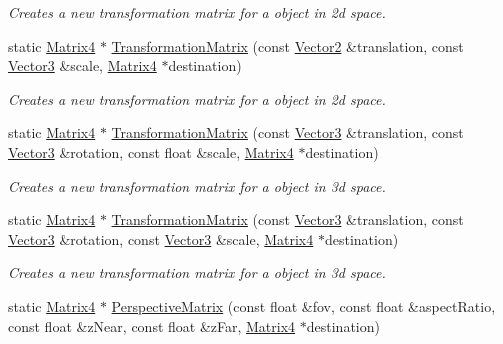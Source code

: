 \begin{DoxyCompactItemize}
\begin{DoxyCompactList}\small\item\em Creates a new transformation matrix for a object in 2d space. \end{DoxyCompactList}\item 
static \hyperlink{class_flounder_1_1_matrix4}{Matrix4} $\ast$ \hyperlink{class_flounder_1_1_matrix4_af42c941d750d1f3ecbafee37783585e3}{Transformation\+Matrix} (const \hyperlink{class_flounder_1_1_vector2}{Vector2} \&translation, const \hyperlink{class_flounder_1_1_vector3}{Vector3} \&scale, \hyperlink{class_flounder_1_1_matrix4}{Matrix4} $\ast$destination)
\begin{DoxyCompactList}\small\item\em Creates a new transformation matrix for a object in 2d space. \end{DoxyCompactList}\item 
static \hyperlink{class_flounder_1_1_matrix4}{Matrix4} $\ast$ \hyperlink{class_flounder_1_1_matrix4_afe0285002331ae41bc05c7ff9aa1bdc3}{Transformation\+Matrix} (const \hyperlink{class_flounder_1_1_vector3}{Vector3} \&translation, const \hyperlink{class_flounder_1_1_vector3}{Vector3} \&rotation, const float \&scale, \hyperlink{class_flounder_1_1_matrix4}{Matrix4} $\ast$destination)
\begin{DoxyCompactList}\small\item\em Creates a new transformation matrix for a object in 3d space. \end{DoxyCompactList}\item 
static \hyperlink{class_flounder_1_1_matrix4}{Matrix4} $\ast$ \hyperlink{class_flounder_1_1_matrix4_a2cb52b3b50b088eb44af475d086cb329}{Transformation\+Matrix} (const \hyperlink{class_flounder_1_1_vector3}{Vector3} \&translation, const \hyperlink{class_flounder_1_1_vector3}{Vector3} \&rotation, const \hyperlink{class_flounder_1_1_vector3}{Vector3} \&scale, \hyperlink{class_flounder_1_1_matrix4}{Matrix4} $\ast$destination)
\begin{DoxyCompactList}\small\item\em Creates a new transformation matrix for a object in 3d space. \end{DoxyCompactList}\item 
static \hyperlink{class_flounder_1_1_matrix4}{Matrix4} $\ast$ \hyperlink{class_flounder_1_1_matrix4_ad3332a79347ad9de069d83f8b5169c25}{Perspective\+Matrix} (const float \&fov, const float \&aspect\+Ratio, const float \&z\+Near, const float \&z\+Far, \hyperlink{class_flounder_1_1_matrix4}{Matrix4} $\ast$destination)

\end{DoxyCompactItemize}
